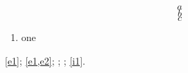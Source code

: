 \documentclass{article}
\begin{document}
\begin{equation}a\label{e1}\end{equation}
\begin{equation}b\label{e2}\end{equation}
\begin{equation}c\label{e3}\end{equation}
\begin{enumerate}\item\label{i1} one\end{enumerate}
\cref{e1}; \cref{e1,e2}; ; ; \cref{i1}.
\end{document}
